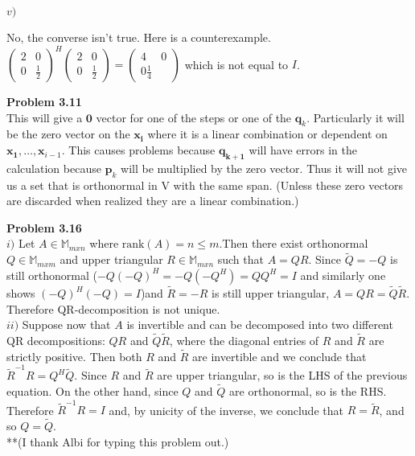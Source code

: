 \documentclass[letterpaper,12pt]{article}
\theoremstyle{definition}
\begin{document}
\noindent $v)$ \begin{center} No, the converse isn't true.  Here is a counterexample. $\left( \begin{smallmatrix} 2&0 \\ 0&\frac{1}{2} \end{smallmatrix} \right)^H \left( \begin{smallmatrix} 2&0 \\ 0&\frac{1}{2} \end{smallmatrix} \right) = \left( \begin{smallmatrix} 4&0 \\ 0\frac{1}{4} \end{smallmatrix} \right) $ which is not equal to $I$.
\end{center}

\vspace{5mm}

\noindent\textbf{Problem 3.11}\\
\indent This will give a $\textbf{0}$ vector for one of the steps or one of the $\boldsymbol{q}_k$.  Particularly it will be the zero vector on the $\boldsymbol{x_i}$ where it is a linear combination or dependent on $\boldsymbol{x_1}, \dots, \boldsymbol{x}_{i -1}$. This causes problems because $\boldsymbol{q_{k+1}}$ will have errors in the calculation because $\boldsymbol{p}_k$ will be multiplied by the zero vector.  Thus it will not give us a set that is orthonormal in V with the same span.  (Unless these zero vectors are discarded when realized they are a linear combination.)\\

\vspace{5mm}

\noindent\textbf{Problem 3.16}\\
\noindent $i)$ Let $A\in\mathbb M_{mxn}$ where $\text{rank}(A)=n\leq m$.Then there exist orthonormal $Q\in\mathbb M_{mxm}$ and upper triangular $R\in\mathbb M_{mxn}$ such that $A=QR$.
Since $\tilde{Q}=-Q$ is still orthonormal ($-Q(-Q)^H=-Q(-Q^H)=QQ^H=I$ and similarly one shows $(-Q)^H(-Q)=I$)and $\tilde{R}=-R$ is still upper triangular, 
$A=QR=\tilde{Q}\tilde{R}$. Therefore QR-decomposition is not unique.\\
\noindent $ii)$ Suppose now that $A$ is invertible and can be decomposed into 
two different QR decompositions: $QR$ and $\tilde{Q}\tilde{R}$, where the diagonal entries of $R$ and $\tilde{R}$ are strictly positive. Then both $R$ and $\tilde{R}$ are invertible and we conclude that
$\tilde{R}^{-1}R=Q^H\tilde{Q}$. Since $R$ and $\tilde{R}$ are upper triangular, so is the LHS of the previous equation.
On the other hand, since $Q$ and $\tilde{Q}$ are orthonormal, so is the RHS. Therefore $\tilde{R}^{-1}R=I$ and, by unicity of the inverse, we conclude that $R=\tilde{R}$,
and so $Q=\tilde{Q}$.\\
**(I thank Albi for typing this problem out.) \\
\end{document}
